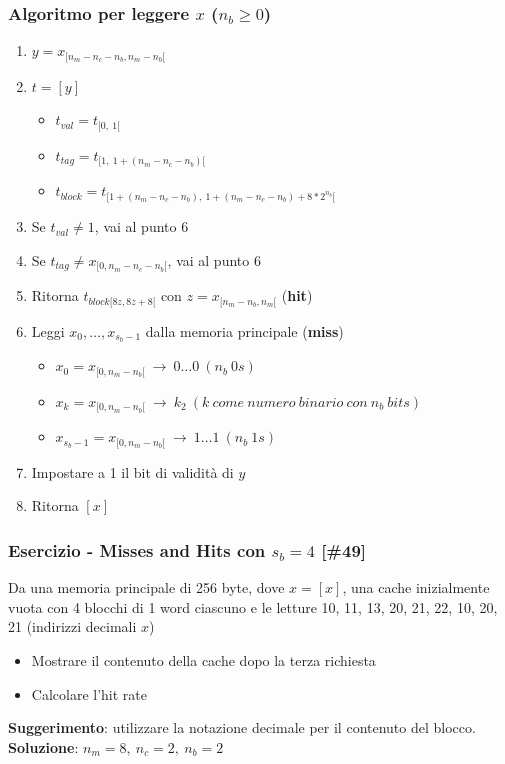 \documentclass[12pt,a4paper]{article}
\begin{document}
\subsubsection{Algoritmo per leggere $x$ ($n_b \geq 0$)}
\begin{enumerate}
\item $y=x_{[n_m-n_c-n_b, n_m - n_b[}$
\item $t= [y]$
\begin{itemize}
\item $t_{val} = t_{[0,\ 1[}$
\item $t_{tag} = t_{[1,\ 1+(n_m-n_c-n_b)[}$
\item $t_{block} = t_{[1+(n_m-n_c-n_b),\ 1+(n_m-n_c-n_b)+8*2^{n_b}[}$
\end{itemize}
\item Se $t_{val} \not = 1$, vai al punto 6
\item Se $t_{tag} \not = x_{[0,n_m - n_c - n_b[}$, vai al punto 6
\item Ritorna $t_{block[8z,8z+8[}$ con $z=x_{[n_m-n_b, n_m[}$ (\textbf{hit})
\item Leggi $x_0, \dots, x_{s_b -1}$ dalla memoria principale (\textbf{miss})
\begin{itemize}
\item $x_0 = x_{[0, n_m - n_b[}\ \rightarrow\ 0\dots 0\ (n_b\ 0s)$
\item $x_k = x_{[0, n_m - n_b[}\ \rightarrow\ k_2 \ (k\ come\ numero\ binario\ con\ n_b\ bits)$
\item $x_{s_b -1} = x_{[0, n_m - n_b[}\ \rightarrow\ 1\dots 1\ (n_b\ 1s)$
\end{itemize}
\item Impostare a 1 il bit di validità di $y$
\item Ritorna $[x]$
\end{enumerate}

\subsubsection{Esercizio - Misses and Hits con $s_b = 4$ [\#49]}
Da una memoria principale di 256 byte, dove $x = [x]$, una cache inizialmente vuota con 4 blocchi di 1 word ciascuno e le letture 10, 11, 13, 20, 21, 22, 10, 20, 21 (indirizzi decimali $x$)
\begin{itemize}
\item Mostrare il contenuto della cache dopo la terza richiesta
\item Calcolare l'hit rate
\end{itemize}
\textbf{Suggerimento}: utilizzare la notazione decimale per il contenuto del blocco.\\
\textbf{Soluzione}: $n_m = 8,\ n_c = 2,\ n_b = 2$\\
\end{document}
